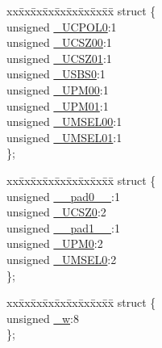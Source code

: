 \begin{DoxyCompactItemize}
\item 
\begin{tabbing}
xx\=xx\=xx\=xx\=xx\=xx\=xx\=xx\=xx\=\kill
struct \{\\
\>unsigned \hyperlink{union_____u_c_s_r0_cbits__t_a8aacccaef3f2a69b95ccf29150379cd6}{\_UCPOL0}:1\\
\>unsigned \hyperlink{union_____u_c_s_r0_cbits__t_a433e313ebba9b8b61bc6f5b8f9cef3b9}{\_UCSZ00}:1\\
\>unsigned \hyperlink{union_____u_c_s_r0_cbits__t_a0054be72298ce9e514beccdc511cc3ef}{\_UCSZ01}:1\\
\>unsigned \hyperlink{union_____u_c_s_r0_cbits__t_ad13f21e0424931ddba2352717f9d5b13}{\_USBS0}:1\\
\>unsigned \hyperlink{union_____u_c_s_r0_cbits__t_a6f5dfbdccaed2a32811af66f58e49918}{\_UPM00}:1\\
\>unsigned \hyperlink{union_____u_c_s_r0_cbits__t_afd7f0eeae3b405be0a62ebd6aee335e7}{\_UPM01}:1\\
\>unsigned \hyperlink{union_____u_c_s_r0_cbits__t_a7250c3dff70bc68742aa1ee2e1af054c}{\_UMSEL00}:1\\
\>unsigned \hyperlink{union_____u_c_s_r0_cbits__t_a23ae6bd96adfa06c1a04626ccba5d439}{\_UMSEL01}:1\\
\}; \\

\end{tabbing}\item 
\begin{tabbing}
xx\=xx\=xx\=xx\=xx\=xx\=xx\=xx\=xx\=\kill
struct \{\\
\>unsigned \hyperlink{union_____u_c_s_r0_cbits__t_a6644bdacc520176893763eefbef33500}{\_\_pad0\_\_}:1\\
\>unsigned \hyperlink{union_____u_c_s_r0_cbits__t_a2cac9ec01be4edec057aff6974798bf3}{\_UCSZ0}:2\\
\>unsigned \hyperlink{union_____u_c_s_r0_cbits__t_a1423aab423deed363e37dd69b2897bf1}{\_\_pad1\_\_}:1\\
\>unsigned \hyperlink{union_____u_c_s_r0_cbits__t_a8774696deba6747cbbd5a467ab4586ae}{\_UPM0}:2\\
\>unsigned \hyperlink{union_____u_c_s_r0_cbits__t_a16db88c115cd0a56f7b72900987f8bac}{\_UMSEL0}:2\\
\}; \\

\end{tabbing}\item 
\begin{tabbing}
xx\=xx\=xx\=xx\=xx\=xx\=xx\=xx\=xx\=\kill
struct \{\\
\>unsigned \hyperlink{union_____u_c_s_r0_cbits__t_acdba0586a684377ddd26d4be1387a050}{\_w}:8\\
\}; \\

\end{tabbing}\end{DoxyCompactItemize}


